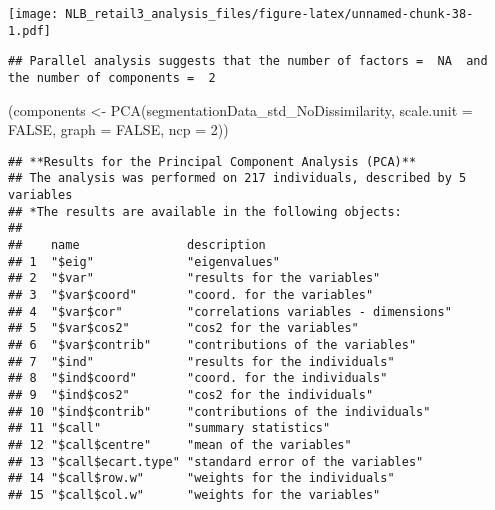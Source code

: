 \documentclass[
]{article}
\newenvironment{Shaded}{\begin{snugshade}}{\end{snugshade}}
\newcommand{\AttributeTok}[1]{\textcolor[rgb]{0.77,0.63,0.00}{#1}}
\newcommand{\ConstantTok}[1]{\textcolor[rgb]{0.00,0.00,0.00}{#1}}
\newcommand{\DecValTok}[1]{\textcolor[rgb]{0.00,0.00,0.81}{#1}}
\newcommand{\FunctionTok}[1]{\textcolor[rgb]{0.00,0.00,0.00}{#1}}
\newcommand{\NormalTok}[1]{#1}
\newcommand{\OtherTok}[1]{\textcolor[rgb]{0.56,0.35,0.01}{#1}}
\newcommand{\SpecialCharTok}[1]{\textcolor[rgb]{0.00,0.00,0.00}{#1}}
\begin{document}
\texttt{[image: NLB\_retail3\_analysis\_files/figure-latex/unnamed-chunk-38-1.pdf]}

\begin{verbatim}
## Parallel analysis suggests that the number of factors =  NA  and the number of components =  2
\end{verbatim}

\begin{Shaded}
\begin{Highlighting}[]
\NormalTok{(components }\OtherTok{\textless{}{-}} \FunctionTok{PCA}\NormalTok{(segmentationData\_std\_NoDissimilarity, }\AttributeTok{scale.unit =} \ConstantTok{FALSE}\NormalTok{, }\AttributeTok{graph =} \ConstantTok{FALSE}\NormalTok{, }\AttributeTok{ncp =} \DecValTok{2}\NormalTok{))}
\end{Highlighting}
\end{Shaded}

\begin{verbatim}
## **Results for the Principal Component Analysis (PCA)**
## The analysis was performed on 217 individuals, described by 5 variables
## *The results are available in the following objects:
## 
##    name               description                          
## 1  "$eig"             "eigenvalues"                        
## 2  "$var"             "results for the variables"          
## 3  "$var$coord"       "coord. for the variables"           
## 4  "$var$cor"         "correlations variables - dimensions"
## 5  "$var$cos2"        "cos2 for the variables"             
## 6  "$var$contrib"     "contributions of the variables"     
## 7  "$ind"             "results for the individuals"        
## 8  "$ind$coord"       "coord. for the individuals"         
## 9  "$ind$cos2"        "cos2 for the individuals"           
## 10 "$ind$contrib"     "contributions of the individuals"   
## 11 "$call"            "summary statistics"                 
## 12 "$call$centre"     "mean of the variables"              
## 13 "$call$ecart.type" "standard error of the variables"    
## 14 "$call$row.w"      "weights for the individuals"        
## 15 "$call$col.w"      "weights for the variables"
\end{verbatim}

\begin{Shaded}
\end{Shaded}
\end{document}
